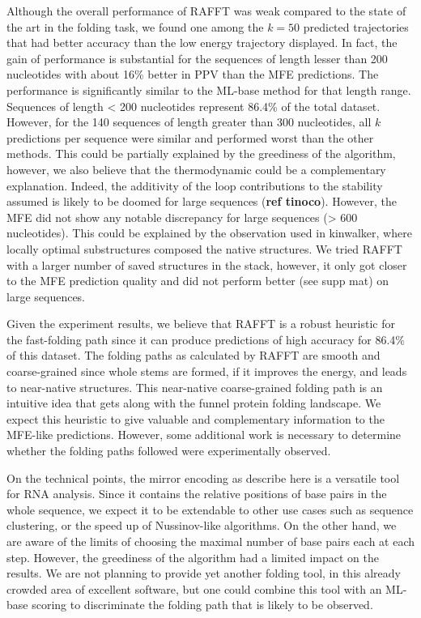\documentclass[a4paper,12pt]{article}
\begin{document}
{{Although the overall performance of RAFFT was weak compared to the state of the
art in the folding task, we found one among the \(k=50\) predicted trajectories
that had better accuracy than the low energy trajectory displayed. In fact, the
gain of performance is substantial for the sequences of length lesser than 200
nucleotides with about 16\% better in PPV than the MFE predictions. The
performance is significantly similar to the ML-base method for that length
range. Sequences of length < 200 nucleotides represent 86.4\% of the total
dataset. However, for the 140 sequences of length greater than 300 nucleotides,
all \(k\) predictions per sequence were similar and performed worst than the other
methods. This could be partially explained by the greediness of the algorithm,
however, we also believe that the thermodynamic could be a complementary
explanation. Indeed, the additivity of the loop contributions to the stability
assumed is likely to be doomed for large sequences (\textbf{ref tinoco}). However, the
MFE did not show any notable discrepancy for large sequences (\textgreater{} 600
nucleotides). This could be explained by the observation used in kinwalker,
where locally optimal substructures composed the native structures. We tried
RAFFT with a larger number of saved structures in the stack, however, it only
got closer to the MFE prediction quality and did not perform better (see supp
mat) on large sequences.

Given the experiment results, we believe that RAFFT is a robust heuristic for
the fast-folding path since it can produce predictions of high accuracy for
86.4\% of this dataset. The folding paths as calculated by RAFFT are smooth and
coarse-grained since whole stems are formed, if it improves the energy, and
leads to near-native structures. This near-native coarse-grained folding path is
an intuitive idea that gets along with the funnel protein folding landscape. We
expect this heuristic to give valuable and complementary information to the
MFE-like predictions. However, some additional work is necessary to determine
whether the folding paths followed were experimentally observed.

On the technical points, the mirror encoding as describe here is a versatile
tool for RNA analysis. Since it contains the relative positions of base pairs in
the whole sequence, we expect it to be extendable to other use cases such as
sequence clustering, or the speed up of Nussinov-like algorithms. On the other
hand, we are aware of the limits of choosing the maximal number of base pairs
each at each step. However, the greediness of the algorithm had a limited impact
on the results. We are not planning to provide yet another folding tool, in this
already crowded area of excellent software, but one could combine this tool with
an ML-base scoring to discriminate the folding path that is likely to be
observed.

}}
\end{document}
